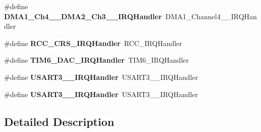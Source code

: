 \begin{DoxyCompactItemize}
\item 
\mbox{\label{group__stm32f030xc_ga035f9aa47c046222541cca70e281b415}} 
\#define {\bfseries D\+M\+A1\+\_\+\+Ch4\+\_\+\_\+\+D\+M\+A2\+\_\+\+Ch3\+\_\+\_\+\+I\+R\+Q\+Handler}~D\+M\+A1\+\_\+\+Channel4\+\_\+\_\+\+I\+R\+Q\+Handler
\item 
\mbox{\label{group__stm32f030xc_ga82a9eac30db2cc914975bc71ce5fcb92}} 
\#define {\bfseries R\+C\+C\+\_\+\+C\+R\+S\+\_\+\+I\+R\+Q\+Handler}~R\+C\+C\+\_\+\+I\+R\+Q\+Handler
\item 
\mbox{\label{group__stm32f030xc_ga7d58a944f63161f2152026eedc430848}} 
\#define {\bfseries T\+I\+M6\+\_\+\+D\+A\+C\+\_\+\+I\+R\+Q\+Handler}~T\+I\+M6\+\_\+\+I\+R\+Q\+Handler
\item 
\mbox{\label{group__stm32f030xc_gae05084e274a2e228d5ccf9423e5bce6e}} 
\#define {\bfseries U\+S\+A\+R\+T3\+\_\+\_\+\+I\+R\+Q\+Handler}~U\+S\+A\+R\+T3\+\_\+\_\+\+I\+R\+Q\+Handler
\item 
\mbox{\label{group__stm32f030xc_ga36a6fa2533fdea503ca6341545d3148e}} 
\#define {\bfseries U\+S\+A\+R\+T3\+\_\+\_\+\+I\+R\+Q\+Handler}~U\+S\+A\+R\+T3\+\_\+\_\+\+I\+R\+Q\+Handler
\end{DoxyCompactItemize}


\subsection{Detailed Description}
